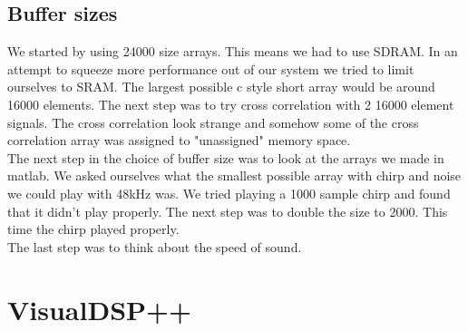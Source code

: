 \subsection{Buffer sizes}
We started by using 24000 size arrays. This means we had to use SDRAM. In an attempt to squeeze more performance out of our system we tried to limit ourselves to SRAM. The largest possible c style short array would be around 16000 elements. The next step was to try cross correlation with 2 16000 element signals. The cross correlation look strange and somehow some of the cross correlation array was assigned to "unassigned" memory space.\\
The next step in the choice of buffer size was to look at the arrays we made in matlab. We asked ourselves what the smallest possible array with chirp and noise we could play with 48kHz was. We tried playing a 1000 sample chirp and found that it didn't play properly. The next step was to double the size to 2000. This time the chirp played properly.\\
The last step was to think about the speed of sound. 
\section{VisualDSP++}
